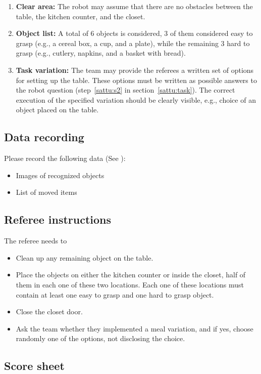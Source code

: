 \begin{enumerate}
\item \textbf{Clear area:} The robot may assume that there are no obstacles between the table, the kitchen counter, and the closet.
\item \textbf{Object list:} A total of 6 objects is considered, 3 of them considered easy to grasp (e.g., a cereal box, a cup, and a plate), while the remaining 3 hard to grasp (e.g., cutlery, napkins, and a basket with bread).
\item \textbf{Task variation:} The team may provide the referees a written set of options for setting up the table. These options must be written as possible answers to the robot question (step~\ref{sattu:s2} in section~\ref{sattu:task}). The correct execution of the specified variation should be clearly visible, e.g., choice of an object placed on the table.
\end{enumerate}

\subsection{Data recording}
  Please record the following data (See ):
  \begin{itemize}
   \item Images of recognized objects
   \item List of moved items
  \end{itemize}

\subsection{Referee instructions}

The referee needs to
\begin{itemize}
\item Clean up any remaining object on the table.
\item Place the objects on either the kitchen counter or inside the closet, half of them in each one of these two locations. Each one of these locations must contain at least one easy to grasp and one hard to grasp object.
\item Close the closet door.
\item Ask the team whether they implemented a meal variation, and if yes, choose randomly one of the options, not disclosing the choice.
\end{itemize}

\subsection{Score sheet}


